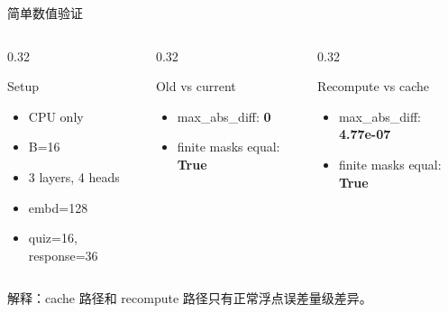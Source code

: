 \documentclass[aspectratio=169,10pt]{ctexbeamer}
\begin{document}
\begin{frame}{简单数值验证}
  \begin{columns}[T,onlytextwidth]
    \begin{column}{0.32\textwidth}
      \begin{block}{Setup}
        \begin{itemize}
          \item CPU only
          \item B=16
          \item 3 layers, 4 heads
          \item embd=128
          \item quiz=16, response=36
        \end{itemize}
      \end{block}
    \end{column}
    \begin{column}{0.32\textwidth}
      \begin{block}{Old vs current}
        \begin{itemize}
          \item max\_abs\_diff: \textbf{0}
          \item finite masks equal: \textbf{True}
        \end{itemize}
      \end{block}
    \end{column}
    \begin{column}{0.32\textwidth}
      \begin{block}{Recompute vs cache}
        \begin{itemize}
          \item max\_abs\_diff: \textbf{4.77e-07}
          \item finite masks equal: \textbf{True}
        \end{itemize}
      \end{block}
    \end{column}
  \end{columns}

  \vspace{0.7em}
  解释：cache 路径和 recompute 路径只有正常浮点误差量级差异。
\end{frame}
\end{document}
